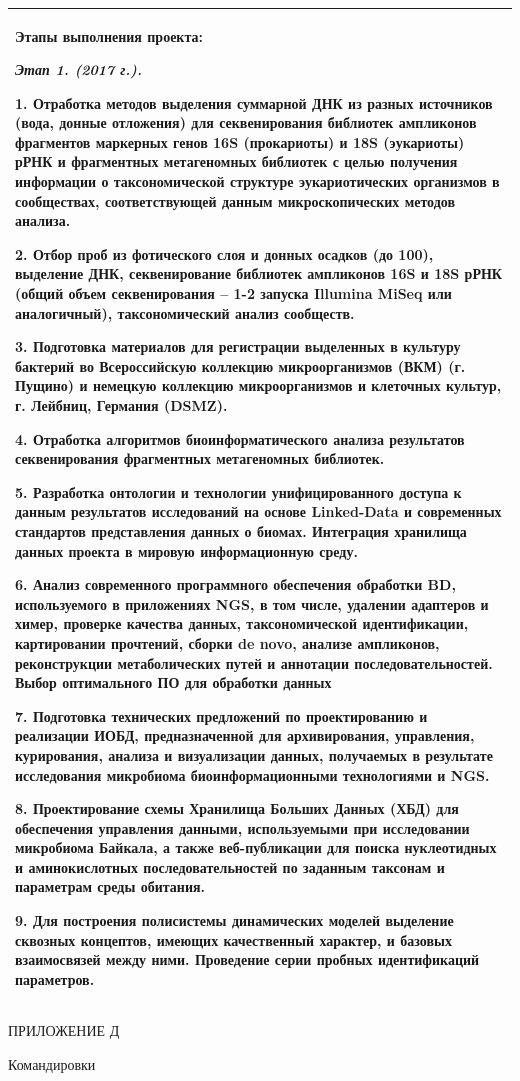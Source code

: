 \documentclass[a4paper,12pt,openany,final]{extreport}
\begin{document}
\begin{longtable}[]{@{}l@{}}
\toprule
\begin{minipage}[t]{0.97\columnwidth}\raggedright
\textbf{Этапы выполнения проекта:}

\emph{\textbf{Этап 1. (2017 г.).}}

1. Отработка методов выделения суммарной ДНК из разных источников (вода,
донные отложения) для секвенирования библиотек ампликонов фрагментов
маркерных генов 16S (прокариоты) и 18S (эукариоты) рРНК и фрагментных
метагеномных библиотек с целью получения информации о таксономической
структуре эукариотических организмов в сообществах, соответствующей
данным микроскопических методов анализа.

2. Отбор проб из фотического слоя и донных осадков (до 100), выделение
ДНК, секвенирование библиотек ампликонов 16S и 18S рРНК (общий объем
секвенирования -- 1-2 запуска Illumina MiSeq или аналогичный),
таксономический анализ сообществ.

3. Подготовка материалов для регистрации выделенных в культуру бактерий
во Всероссийскую коллекцию микроорганизмов (ВКМ) (г. Пущино) и немецкую
коллекцию микроорганизмов и клеточных культур, г. Лейбниц, Германия
(DSMZ).

4. Отработка алгоритмов биоинформатического анализа результатов
секвенирования фрагментных метагеномных библиотек.

5. Разработка онтологии и технологии унифицированного доступа к данным
результатов исследований на основе Linked-Data и современных стандартов
представления данных о биомах. Интеграция хранилища данных проекта в
мировую информационную среду.

6. Анализ современного программного обеспечения обработки BD,
используемого в приложениях NGS, в том числе, удалении адаптеров и
химер, проверке качества данных, таксономической идентификации,
картировании прочтений, сборки de novo, анализе ампликонов,
реконструкции метаболических путей и аннотации последовательностей.
Выбор оптимального ПО для обработки данных

7. Подготовка технических предложений по проектированию и реализации
ИОБД, предназначенной для архивирования, управления, курирования,
анализа и визуализации данных, получаемых в результате исследования
микробиома биоинформационными технологиями и NGS.

8. Проектирование схемы Хранилища Больших Данных (ХБД) для обеспечения
управления данными, используемыми при исследовании микробиома Байкала, а
также веб-публикации для поиска нуклеотидных и аминокислотных
последовательностей по заданным таксонам и параметрам среды обитания.

9. Для построения полисистемы динамических моделей выделение сквозных
концептов, имеющих качественный характер, и базовых взаимосвязей между
ними. Проведение серии пробных идентификаций параметров.\strut
\end{minipage}\tabularnewline
\bottomrule
\end{longtable}

ПРИЛОЖЕНИЕ Д

Командировки
\end{document}
